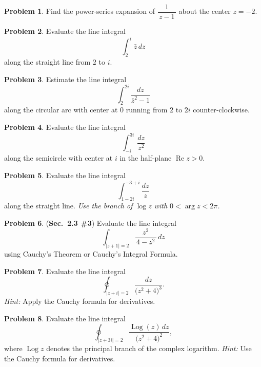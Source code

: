 \documentclass[10pt]{article}
\DeclareMathOperator{\Log}{Log}
\theoremstyle{definition} %
\newtheorem{problem}{Problem}
\theoremstyle{plain} %
\begin{document}
\begin{problem}
  Find the power‑series expansion of \(\dfrac{1}{\,z-1\,}\) about the center \(z=-2\).
\end{problem}
\begin{problem}
  Evaluate the line integral
  \[
      \int_{2}^{i} \bar{z}\,dz
  \]
  along the straight line from $2$ to $i$.
\end{problem}

\begin{problem}
  Estimate the line integral
  \[
      \int_{2}^{2i} \frac{dz}{\bar{z}^{2}-1}
  \]
  along the circular arc with center at $0$ running from $2$ to $2i$ counter‑clockwise.
\end{problem}

\begin{problem}
  Evaluate the line integral
  \[
      \int_{-i}^{3i} \frac{dz}{z^{2}}
  \]
  along the semicircle with center at $i$ in the half‑plane $\operatorname{Re} z > 0$.
\end{problem}

\begin{problem}
  Evaluate the line integral
  \[
      \int_{1-2i}^{-3+i} \frac{dz}{z}
  \]
  along the straight line.  
  \textit{Use the branch of $\log z$ with $0 < \arg z < 2\pi$.}
\end{problem}
\begin{problem}
  (\textbf{Sec.\ 2.3 \#3})\; Evaluate the line integral
  \[
      \int_{\lvert z+1\rvert = 2} \frac{z^{2}}{\,4 - z^{2}\,}\,dz
  \]
  using Cauchy’s Theorem or Cauchy’s Integral Formula.
\end{problem}

\begin{problem}
  Evaluate the line integral
  \[
      \oint_{\lvert z + i\rvert = 2} \frac{dz}{\bigl(z^{2}+4\bigr)^{3}}.
  \]
  \emph{Hint:} Apply the Cauchy formula for derivatives.
\end{problem}

\begin{problem}
  Evaluate the line integral
  \[
      \oint_{\lvert z + 3i\rvert = 2} \frac{\Log(z)\,dz}{\bigl(z^{2}+4\bigr)^{2}},
  \]
  where \(\Log z\) denotes the principal branch of the complex logarithm.  
  \emph{Hint:} Use the Cauchy formula for derivatives.
\end{problem}
\end{document}
